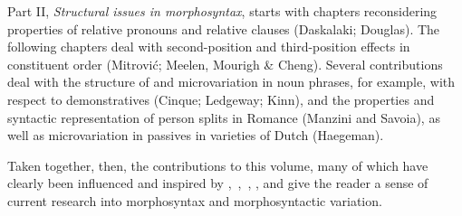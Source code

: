 \documentclass[output=paper]{langsci/langscibook}
\begin{document}
Part II, \emph{Structural issues in morphosyntax}, starts with chapters
reconsidering properties of relative pronouns and relative clauses (Daskalaki;
Douglas). The following chapters deal with second-position and third-position
effects in constituent order (Mitrović; Meelen, Mourigh \& Cheng). Several
contributions deal with the structure of and microvariation in noun phrases,
for example, with respect to demonstratives (Cinque; Ledgeway; Kinn), and the
properties and syntactic representation of person splits in Romance (Manzini
and Savoia), as well as microvariation in passives in varieties of Dutch
(Haegeman).

Taken together, then, the contributions to this volume, many of which have
clearly been influenced and inspired by
\textcite{Roberts2010,Roberts2012},~\textcite{RobRou2003},~\textcite{RobHol2010},
\textcite{BibRob2012,BibRob2015}, and \textcite{BibHolRob2014} give the reader
a sense of current research into morphosyntax and morphosyntactic variation.

{\sloppy
    \printbibliography[heading=subbibliography,notkeyword=this]
}
\end{document}
